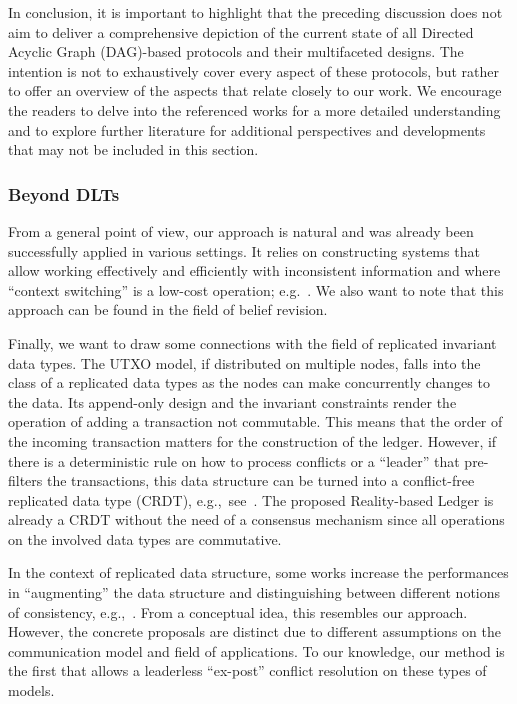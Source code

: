 \documentclass[11pt]{article}
\theoremstyle{plain}
\theoremstyle{definition}
\numberwithin{definition}{section}
\numberwithin{lemma}{section}
\numberwithin{ass}{section}
\numberwithin{remark}{section}
\numberwithin{example}{section}
\numberwithin{proposition}{section}
\numberwithin{theorem}{section}
\begin{document}
In conclusion, it is important to highlight that the preceding discussion does not aim to deliver a comprehensive depiction of the current state of all Directed Acyclic Graph (DAG)-based protocols and their multifaceted designs. The intention is not to exhaustively cover every aspect of these protocols, but rather to offer an overview of the  aspects that relate closely to our work. We encourage the readers to delve into the referenced works for a more detailed understanding and to explore further literature for additional perspectives and developments that may not be included in this section.


\subsubsection{Beyond DLTs}

From  a general point of view, our approach is natural and was already been successfully applied in various settings. It relies on constructing  systems that allow working effectively and efficiently with inconsistent information and where ``context switching'' is a low-cost operation; e.g.~\cite{TMS}. We also want to note that this approach can be found in the field of belief revision. 

Finally, we want to draw some connections with the field of replicated invariant data types. The UTXO model, if distributed on multiple nodes, falls into the class of a replicated data types as the nodes can make concurrently changes to the data. Its append-only design and the invariant constraints render the operation of adding a transaction not commutable. This means that the order of the incoming transaction matters for the construction of the ledger. However, if there is a deterministic rule on how to process conflicts or a ``leader'' that pre-filters the transactions, this data structure can be turned into a conflict-free replicated data type (CRDT), e.g.,~see~\cite{CRDT}. The proposed Reality-based Ledger is already a CRDT without the need of a consensus mechanism since all operations on the involved data types are commutative.

In the context of replicated data structure, some works increase the performances in ``augmenting'' the data structure and distinguishing between different notions of consistency, e.g.,~\cite{redblue, automatingChoiceOfConsitency}. From a conceptual idea, this resembles our approach. However, the concrete proposals are distinct due to different assumptions on the communication model and field of applications. To our knowledge, our method is the first that allows a leaderless ``ex-post'' conflict resolution on these types of models. 
\end{document}
